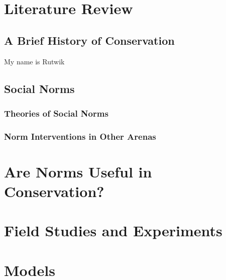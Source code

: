 \documentclass[rutwik_proposal.tex]{subfiles}
\begin{document}
\chapter{Literature Review}\label{ch:litrev}

\section{A Brief History of Conservation}\label{sec:history}
My name is Rutwik

\section{Social Norms}\label{sec:norms}
\subsection{Theories of Social Norms}\label{subsec:theories}
\subsection{Norm Interventions in Other Arenas}\label{subsec:interventions}

\chapter{Are Norms Useful in Conservation?}\label{ch:usefulness}

\chapter{Field Studies and Experiments}\label{ch:field}

\chapter{Models}\label{ch:models}
\end{document}
